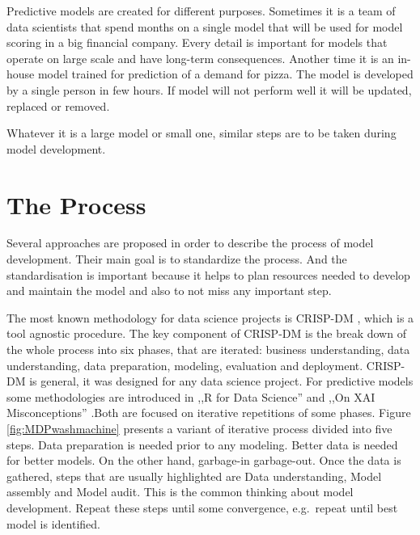 \documentclass[]{krantz}
\begin{document}
Predictive models are created for different purposes. Sometimes it is a team of data scientists that spend months on a single model that will be used for model scoring in a big financial company. Every detail is important for models that operate on large scale and have long-term consequences. Another time it is an in-house model trained for prediction of a demand for pizza. The model is developed by a single person in few hours. If model will not perform well it will be updated, replaced or removed.

Whatever it is a large model or small one, similar steps are to be taken during model development.

\hypertarget{MDPprocess}{%
\section{The Process}\label{MDPprocess}}

Several approaches are proposed in order to describe the process of model development. Their main goal is to standardize the process. And the standardisation is important because it helps to plan resources needed to develop and maintain the model and also to not miss any important step.

The most known methodology for data science projects is CRISP-DM \citep{crisp1999}, \citep{crisp2019wiki} which is a tool agnostic procedure. The key component of CRISP-DM is the break down of the whole process into six phases, that are iterated: business understanding, data understanding, data preparation, modeling, evaluation and deployment. CRISP-DM is general, it was designed for any data science project. For predictive models some methodologies are introduced in ,,R for Data Science'' \citep{r4ds2019} and ,,On XAI Misconceptions'' \citep{misconceptions2019}.Both are focused on iterative repetitions of some phases.
Figure \ref{fig:MDPwashmachine} presents a variant of iterative process divided into five steps. Data preparation is needed prior to any modeling. Better data is needed for better models. On the other hand, garbage-in garbage-out. Once the data is gathered, steps that are usually highlighted are Data understanding, Model assembly and Model audit. This is the common thinking about model development. Repeat these steps until some convergence, e.g.~repeat until best model is identified.
\end{document}
